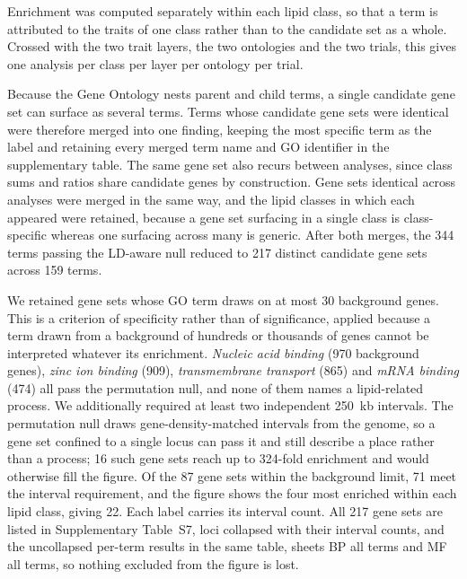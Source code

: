 \documentclass[9pt,twocolumn,twoside]{rilabRxiv}
\begin{document}
Enrichment was computed separately within each lipid class, so that a term is attributed to the traits of one class rather than to the candidate set as a whole. Crossed with the two trait layers, the two ontologies and the two trials, this gives one analysis per class per layer per ontology per trial.

Because the Gene Ontology nests parent and child terms, a single candidate gene set can surface as several terms. Terms whose candidate gene sets were identical were therefore merged into one finding, keeping the most specific term as the label and retaining every merged term name and GO identifier in the supplementary table. The same gene set also recurs between analyses, since class sums and ratios share candidate genes by construction. Gene sets identical across analyses were merged in the same way, and the lipid classes in which each appeared were retained, because a gene set surfacing in a single class is class-specific whereas one surfacing across many is generic. After both merges, the 344 terms passing the LD-aware null reduced to 217 distinct candidate gene sets across 159 terms.

We retained gene sets whose GO term draws on at most 30 background genes. This is a criterion of specificity rather than of significance, applied because a term drawn from a background of hundreds or thousands of genes cannot be interpreted whatever its enrichment. \textit{Nucleic acid binding} (970 background genes), \textit{zinc ion binding} (909), \textit{transmembrane transport} (865) and \textit{mRNA binding} (474) all pass the permutation null, and none of them names a lipid-related process. We additionally required at least two independent 250~kb intervals. The permutation null draws gene-density-matched intervals from the genome, so a gene set confined to a single locus can pass it and still describe a place rather than a process; 16 such gene sets reach up to 324-fold enrichment and would otherwise fill the figure. Of the 87 gene sets within the background limit, 71 meet the interval requirement, and the figure shows the four most enriched within each lipid class, giving 22. Each label carries its interval count. All 217 gene sets are listed in Supplementary Table~S7, loci collapsed with their interval counts, and the uncollapsed per-term results in the same table, sheets BP all terms and MF all terms, so nothing excluded from the figure is lost.
\end{document}
